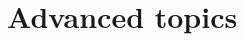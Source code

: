 \documentclass[oneside]{gsm-l} %
\numberwithin{section}{chapter}
\numberwithin{equation}{chapter}
\numberwithin{figure}{chapter}
\begin{document}
%

\part{Advanced topics}







\appendix




\backmatter
{\RaggedRight

}


\printindex
\end{document}
